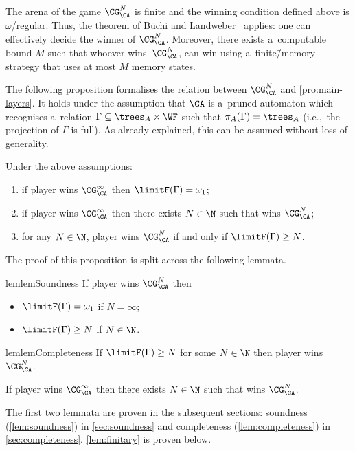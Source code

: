 \documentclass{lmcs}
\numberwithin{equation}{section}
\numberwithin{figure}{section}
\begin{document}
\begin{rem}
\label{rem:decide-winner}
	The arena of the game $\CG^N_\CA$ is finite and the winning condition defined above is $\omega$\=/regular.
	Thus, the theorem of Büchi and Landweber~\cite{buchi_synthesis} applies: one can effectively decide the winner of $\CG^N_\CA$.
	Moreover, there exists a~computable bound $M$ such that whoever wins~$\CG^N_\CA$, can win using a~finite\=/memory strategy that uses at most $M$ memory states.
\end{rem}

The following proposition formalises the relation between $\CG^N_\CA$ and \cref{pro:main-layers}.
It holds under the assumption that $\CA$ is a~pruned automaton which recognises a~relation $\Gamma\subseteq\trees_A\times\WF$ such that $\pi_A(\Gamma)=\trees_A$ (i.e.,~the projection of $\Gamma$ is full).
As already explained, this can be assumed without loss of generality.

\begin{prop}
	Under the above assumptions:
	\begin{enumerate}
	\item if player \eve wins $\CG^\infty_\CA$ then $\limitF(\Gamma)=\omega_1$;
	\item if player \adam wins $\CG^\infty_\CA$ then there exists $N\in\N$ such that \adam wins $\CG^N_\CA$;
	\item for any $N\in\N$, player \eve wins $\CG^N_\CA$ if and only if $\limitF(\Gamma)\geq N$.
	\end{enumerate}
\end{prop}
\noindent %
The proof of this proposition is split across the following lemmata.

\begin{restatable}{lem}{lemSoundness}
\label{lem:soundness}
	If player \eve wins $\CG^N_\CA$ then
	\begin{itemize}
		\item $\limitF(\Gamma)=\omega_1$ if $N=\infty$;
		\item $\limitF(\Gamma)\geq N$ if $N\in\N$.
	\end{itemize}
\end{restatable}

\begin{restatable}{lem}{lemCompleteness}
\label{lem:completeness}
	If $\limitF(\Gamma)\geq N$ for some $N\in\N$ then player \eve wins $\CG^N_\CA$.
\end{restatable}

\begin{lem}\label{lem:finitary}
	If player \adam wins $\CG^\infty_\CA$ then there exists $N\in\N$ such that \adam wins $\CG^N_\CA$.
\end{lem}
\noindent %
The first two lemmata are proven in the subsequent sections: soundness (\cref{lem:soundness}) in \cref{sec:soundness}
and completeness (\cref{lem:completeness}) in \cref{sec:completeness}. \cref{lem:finitary} is proven below.
\end{document}
